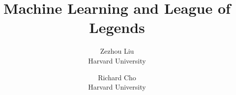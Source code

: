 \documentclass[letterpaper,twocolumn,12pt]{article}
\begin{document}
\date{}

\title{\Large \bf Machine Learning and League of Legends}

\author{
{\rm Zezhou Liu}\\
Harvard University
\and
{\rm Richard Cho}\\
Harvard University
}

\maketitle

\thispagestyle{empty}







{\footnotesize 
}
\end{document}
